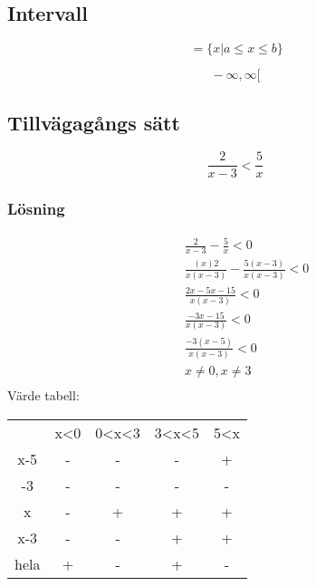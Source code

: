 \begin{multicols}{2}
\subsection{Intervall}
\begin{equation}
[ \, a, b ] \, = \{ x | a \leq x \leq b \}
\end{equation}

\begin{equation}
[ \, a, \infty [ \,
\end{equation}
\begin{equation}
] \, -\infty, \infty [ \,
\end{equation}

\subsection{Tillvägagångs sätt}
\begin{equation}
\frac { 2 } { x - 3 } < \frac { 5 } { x }
\end{equation}


\subsubsection{Lösning}
\begin{align*}
&\quad \frac{ 2 }{ x - 3 } - \frac{ 5 }{ x } < 0 \\
&\quad \frac{(x) 2 }{x (x - 3)} - \frac{ 5 ( x - 3 )}{ x ( x - 3 ) } < 0 \\
&\quad \frac{ 2 x - 5 x - 15 }{ x ( x - 3 ) } < 0 \\
&\quad \frac{ - 3 x - 15 }{ x ( x - 3 ) } < 0 \\
&\quad \frac{ - 3 ( x - 5 ) }{ x ( x - 3 ) } < 0 \\
&\quad  x \neq 0 , x \neq 3 \\
\end{align*}
Värde tabell:
\begin{center}
\begin{tabular}{ |c|c|c|c|c| } 
 \hline
        & x<0   & 0<x<3 & 3<x<5 & 5<x   \\ 
 x-5    & -     & -     & -     & +     \\ 
 -3     & -     & -     & -     & -     \\  
 x      & -     & +     & +     & +     \\ 
 x-3    & -     & -     & +     & +     \\ 
 hela   & +     & -     & +     & -     \\ 
 \hline
\end{tabular}
\end{center}




\end{multicols}

